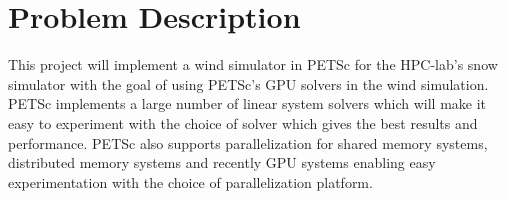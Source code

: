 \section*{Problem Description}

This project will implement a wind simulator in PETSc for the HPC-lab's snow simulator
with the goal of using PETSc's GPU solvers in the wind simulation.
PETSc implements a large number of linear system solvers which will make
it easy to experiment with the choice of solver which gives the best results and
performance. PETSc also supports parallelization for shared memory systems,
distributed memory systems and recently GPU systems enabling easy experimentation
with the choice of parallelization platform.
